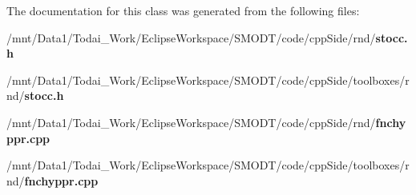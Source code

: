 The documentation for this class was generated from the following files\-:\begin{DoxyCompactItemize}
\item 
/mnt/\-Data1/\-Todai\-\_\-\-Work/\-Eclipse\-Workspace/\-S\-M\-O\-D\-T/code/cpp\-Side/rnd/{\bf stocc.\-h}\item 
/mnt/\-Data1/\-Todai\-\_\-\-Work/\-Eclipse\-Workspace/\-S\-M\-O\-D\-T/code/cpp\-Side/toolboxes/rnd/{\bf stocc.\-h}\item 
/mnt/\-Data1/\-Todai\-\_\-\-Work/\-Eclipse\-Workspace/\-S\-M\-O\-D\-T/code/cpp\-Side/rnd/{\bf fnchyppr.\-cpp}\item 
/mnt/\-Data1/\-Todai\-\_\-\-Work/\-Eclipse\-Workspace/\-S\-M\-O\-D\-T/code/cpp\-Side/toolboxes/rnd/{\bf fnchyppr.\-cpp}\end{DoxyCompactItemize}
